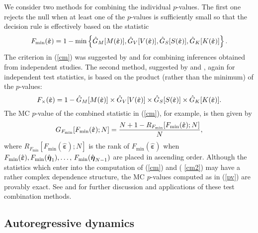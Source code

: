 \documentclass[11pt]{article}
\begin{document}
We consider two methods for combining the individual $p$-values. The first
one rejects the null when at least one of the $p$-values is sufficiently
small so that the decision rule is effectively based on the statistic 
\begin{equation}
F_{\min }(\hat{\boldsymbol{\varepsilon }})=1-\min \left\{ \hat{G}_{M}[M(\hat{%
\boldsymbol{\varepsilon }})],\hat{G}_{V}[V(\hat{\boldsymbol{\varepsilon }})],%
\hat{G}_{S}[S(\hat{\boldsymbol{\varepsilon }})],\hat{G}_{K}[K(\hat{%
\boldsymbol{\varepsilon }})]\right\} .  \label{cm}
\end{equation}%
The criterion in (\ref{cm}) was suggested by \citet{Tippett:1931} and %
\citet{Wilkinson:1951} for combining inferences obtained from independent
studies. The second method, suggested by \citet{Fisher:1932} and %
\citet{Pearson:1933}, again for independent test statistics, is based on the
product (rather than the minimum) of the $p$-values: 
\begin{equation}
F_{\times }(\hat{\boldsymbol{\varepsilon }})=1-\hat{G}_{M}[M(\hat{%
\boldsymbol{\varepsilon }})]\times \hat{G}_{V}[V(\hat{\boldsymbol{%
\varepsilon }})]\times \hat{G}_{S}[S(\hat{\boldsymbol{\varepsilon }})]\times 
\hat{G}_{K}[K(\hat{\boldsymbol{\varepsilon }})].  \label{cm2}
\end{equation}%
The MC $p$-value of the combined statistic in (\ref{cm}), for example, is
then given by 
\begin{equation}
G_{F_{\min }}[F_{\min }(\hat{\boldsymbol{\varepsilon }});N]=\frac{%
N+1-R_{F_{\min }}[F_{\min }(\hat{\boldsymbol{\varepsilon }});N]}{N},
\label{pv}
\end{equation}%
where $R_{F_{\min }}[F_{\min }(\hat{\boldsymbol{\varepsilon }});N]$ is the
rank of $F_{\min }(\hat{\boldsymbol{\varepsilon }})$ when $F_{\min }(\hat{%
\boldsymbol{\varepsilon }}),F_{\min }(\hat{\boldsymbol{\eta }}_{1}),\ldots
,\,F_{\min }(\hat{\boldsymbol{\eta }}_{N-1})$ are placed in ascending order.
Although the statistics which enter into the computation of (\ref{cm}) and (%
\ref{cm2}) may have a rather complex dependence structure, the MC $p$-values
computed as in (\ref{pv}) are provably exact. See %
\citet{Dufour-Khalaf-Bernard-Genest:2004} and \citet{Dufour-Khalaf-Voia:2014}
for further discussion and applications of these test combination methods.

\subsection{Autoregressive dynamics}
\end{document}
